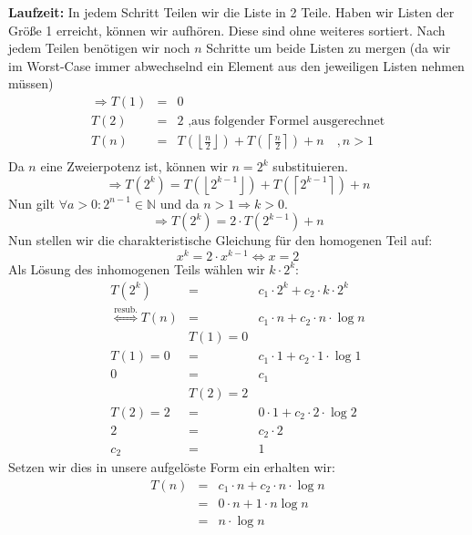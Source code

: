 \documentclass[11pt,a4paper,ngerman]{article}
\begin{document}
\begin{description}
\begin{description}
\item{\bfseries Laufzeit:} In jedem Schritt Teilen wir die Liste in 2 Teile. Haben wir Listen der Größe 1 erreicht, können wir aufhören. Diese sind ohne weiteres sortiert. Nach jedem Teilen benötigen wir noch $n$ Schritte um beide Listen zu mergen (da wir im Worst-Case immer abwechselnd ein Element aus den jeweiligen Listen nehmen müssen)
$$
\begin{array}{rcl}
\Rightarrow T(1) &=& 0  \\
T(2) &=& 2 \text{ ,aus folgender Formel ausgerechnet}\\
T(n) &=& T(\left\lfloor \frac{n}{2} \right\rfloor)+ T(\left\lceil \frac{n}{2} \right\rceil) + n  \quad , n>1\\
\end{array}
$$
Da $n$ eine Zweierpotenz ist, können wir $n = 2^k$ substituieren.
$$\Rightarrow T(2^k) = T\left(\left\lfloor 2^{k-1} \right\rfloor\right)+ T(\left\lceil 2^{k-1} \right\rceil) + n$$
Nun gilt $\forall a > 0 : 2^{n-1} \in \mathbb{N} $ und da $n>1 \Rightarrow k>0$.
$$\Rightarrow T(2^k) = 2\cdot T(2^{k-1}) + n$$
Nun stellen wir die charakteristische Gleichung für den homogenen Teil auf:
$$x^k = 2\cdot x^{k-1} \Leftrightarrow x = 2$$
Als Lösung des inhomogenen Teils wählen wir $k \cdot 2^k$:
$$
\begin{array}{rcl}
T(2^k) &=& c_1 \cdot 2^k + c_2 \cdot k \cdot 2^k\\
\stackrel{\text{resub.}}{\Leftrightarrow} T(n) &=& c_1 \cdot n + c_2 \cdot n \cdot \log n\\
&T(1) = 0&\\
T(1) = 0 &=& c_1 \cdot 1 + c_2 \cdot 1 \cdot \log 1\\
0&=&c_1\\
&T(2) = 2&\\
T(2) = 2 &=& 0 \cdot 1 + c_2 \cdot 2 \cdot \log 2\\
2&=&c_2 \cdot 2\\
c_2 &=& 1 
\end{array}
$$
Setzen wir dies in unsere aufgelöste Form ein erhalten wir:
$$
\begin{array}{rcl}
T(n) &=& c_1 \cdot n + c_2 \cdot n \cdot \log n\\ &=& 0 \cdot n + 1 \cdot n \log n \\ &=& n \cdot \log n
\end{array}
$$

\end{description}

\end{description}
\end{document}
